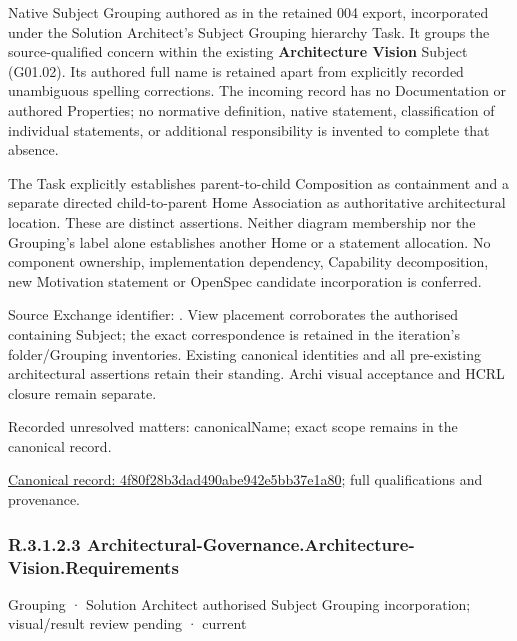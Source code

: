 Native Subject Grouping authored as \texttt{} in the retained 004 export,
incorporated under the Solution Architect's Subject Grouping hierarchy Task.
It groups the source-qualified \texttt{} concern within
the existing \textbf{Architecture Vision} Subject (G01.02). Its authored full name
is retained apart from explicitly recorded unambiguous spelling corrections.
The incoming record has no Documentation or authored Properties; no normative
definition, native statement, classification of individual statements, or
additional responsibility is invented to complete that absence.



The Task explicitly establishes parent-to-child Composition as containment and
a separate directed child-to-parent Home Association as authoritative architectural
location. These are distinct assertions. Neither diagram membership nor the
Grouping's label alone establishes another Home or a statement allocation.
No component ownership, implementation dependency, Capability decomposition,
new Motivation statement or OpenSpec candidate incorporation is conferred.



Source Exchange identifier: \texttt{}. View placement corroborates
the authorised containing Subject; the exact correspondence is retained in the
iteration's folder/Grouping inventories. Existing canonical identities and all
pre-existing architectural assertions retain their standing. Archi visual
acceptance and HCRL closure remain separate.


{\small Recorded unresolved matters: canonicalName; exact scope remains in the canonical record.}\par
{\footnotesize \href{../../../../continuum/grouping/4f80f28b3dad490abe942e5bb37e1a80.md}{Canonical record: 4f80f28b3dad490abe942e5bb37e1a80}; full qualifications and provenance.}\par
\subsubsection*{R.3.1.2.3 Architectural-Governance.Architecture-Vision.Requirements}
\label{navigation:R.3.1.2.3}

\label{element:eabbd522676448fcb075f7d4b5ef4434}
{\small Grouping · Solution Architect authorised Subject Grouping incorporation; visual/result review pending · current}\par

